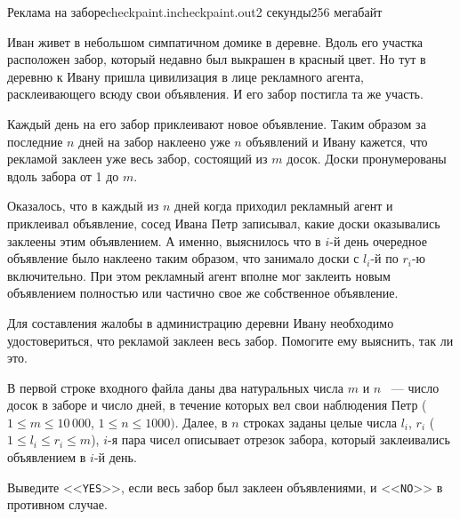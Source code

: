 \begin{problem}{Реклама на заборе}{checkpaint.in}{checkpaint.out}{2 секунды}{256 мегабайт}


Иван живет в небольшом симпатичном домике в деревне. Вдоль его участка расположен забор,
который недавно был выкрашен в красный цвет. Но тут в деревню к Ивану пришла цивилизация
в лице рекламного агента, расклеивающего всюду свои объявления. 
И его забор постигла та же участь. 

Каждый день на его забор приклеивают новое объявление.
Таким образом за последние $n$ дней на забор наклеено уже $n$ объявлений и Ивану кажется, 
что рекламой заклеен уже весь забор, состоящий из $m$
досок. Доски пронумерованы вдоль забора от 1 до $m$.

Оказалось, что в каждый из $n$ дней когда приходил рекламный агент и приклеивал
объявление, сосед Ивана Петр записывал, какие доски оказывались заклеены этим объявлением. 
А именно, выяснилось что в $i$-й день очередное объявление было наклеено 
таким образом, что занимало доски с $l_i$-й по $r_i$-ю включительно. 
При этом рекламный агент вполне мог заклеить новым объявлением полностью или
частично свое же собственное объявление.

Для составления жалобы в администрацию деревни Ивану необходимо удостовериться, что
рекламой заклеен весь забор. Помогите ему выяснить, так ли это.

\InputFile
В первой строке входного файла даны два натуральных числа $m$ и $n$ ~--- 
число досок в заборе и число дней, в течение которых вел свои наблюдения Петр
($1 \le m \le 10\,000$, $1 \le n \le 1000)$.
Далее, в $n$ строках заданы целые числа $l_i$, $r_i$ ($1 \le l_i \le r_i \le m$), $i$-я
пара чисел описывает отрезок забора, который заклеивались объявлением в $i$-й день.

\OutputFile
Выведите <<\texttt{YES}>>, если весь забор был заклеен объявлениями, и <<\texttt{NO}>>
в противном случае.

\Examples

\begin{example}%
%
\end{example}

\end{problem}

